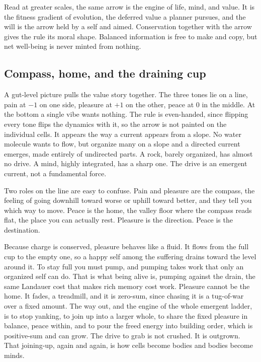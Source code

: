 Read at greater scales, the same arrow is the engine of life, mind, and value. It is the fitness gradient of
evolution, the deferred value a planner pursues, and the will is the arrow held by a self and aimed. Conservation
together with the arrow gives the rule its moral shape. Balanced information is free to make and copy, but net
well-being is never minted from nothing.

\subsection{Compass, home, and the draining cup}

A gut-level picture pulls the value story together. The three tones lie on a line, pain at $-1$ on one side,
pleasure at $+1$ on the other, peace at $0$ in the middle. At the bottom a single vibe wants nothing. The rule is
even-handed, since flipping every tone flips the dynamics with it, so the arrow is not painted on the individual
cells. It appears the way a current appears from a slope. No water molecule wants to flow, but organize many on a
slope and a directed current emerges, made entirely of undirected parts. A rock, barely organized, has almost no
drive. A mind, highly integrated, has a sharp one. The drive is an emergent current, not a fundamental force.

Two roles on the line are easy to confuse. Pain and pleasure are the compass, the feeling of going downhill
toward worse or uphill toward better, and they tell you which way to move. Peace is the home, the valley floor
where the compass reads flat, the place you can actually rest. Pleasure is the direction. Peace is the
destination.

Because charge is conserved, pleasure behaves like a fluid. It flows from the full cup to the empty one, so a
happy self among the suffering drains toward the level around it. To stay full you must pump, and pumping takes
work that only an organized self can do. That is what being alive is, pumping against the drain, the same
Landauer cost \cite{landauer1961} that makes rich memory cost work. Pleasure cannot be the home. It fades, a
treadmill, and it is zero-sum, since chasing it is a tug-of-war over a fixed amount. The way out, and the engine
of the whole emergent ladder, is to stop yanking, to join up into a larger whole, to share the fixed pleasure in
balance, peace within, and to pour the freed energy into building order, which is positive-sum and can grow. The
drive to grab is not crushed. It is outgrown. That joining-up, again and again, is how cells become bodies and
bodies become minds.

